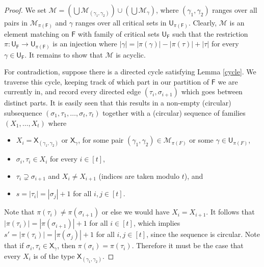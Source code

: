 \documentclass[10pt]{amsart}
\newcommand{\MM}{\mathcal{M}}
\theoremstyle{definition}
\begin{document}
\begin{proof}
		We set $\MM=(\bigcup\MM_{(\gamma_1,\gamma_2)})\cup (\bigcup\MM_\gamma)$, where $(\gamma_1, \gamma_2)$ ranges over all pairs in $\MM_{\pi(\mathsf{F})}$ and $\gamma$ ranges over all critical sets in $\mathsf{U}_{\pi(\mathsf{F})}$. 
		Clearly, $\MM$ is an element matching on $\mathsf{F}$ with family of critical sets $\mathsf{U}_\mathsf{F}$ such that the restriction $\pi: \mathsf{U}_\mathsf{F}\to \mathsf{U}_{\pi(\mathsf{F})}$ is an injection where $|\gamma|=|\pi(\gamma)|-|\pi(\tau)|+|\tau|$ for every $\gamma \in \mathsf{U}_{\mathsf{F}}$.
		It remains to show that $\MM$ is acyclic. 
		
		For contradiction, suppose there is a directed cycle 
		satisfying Lemma \ref{cycle}.
		We traverse this cycle, keeping track of which part in our partition of $\mathsf{F}$ we are currently in, and record every directed edge $(\tau_i, \sigma_{i+1})$ which goes between distinct parts. It is easily seen that this results in a non-empty (circular) subsequence $(\sigma_{1}, \tau_{1}, \dots, \sigma_{t}, \tau_{t})$ together with a (circular) sequence of families $(X_1, \dots, X_t)$ where
		\begin{itemize}
			\item $X_i = \mathsf{X}_{(\gamma_1, \gamma_2)}$ or $\mathsf{X}_\gamma$, for some pair $(\gamma_1, \gamma_2) \in \MM_{\pi(F)}$ or some $\gamma \in \mathsf{U}_{\pi(F)}$,
			\item $\sigma_{i}, \tau_{i} \in X_i$ for every $i\in [t]$,
			\item $\tau_{i} \supsetneq \sigma_{i+1}$ and $X_i\ne X_{i+1}$ (indices are taken modulo $t$), and
			\item $s=|\tau_i|=|\sigma_{j}|+1$ for all $i,j\in [t]$. \end{itemize}
		Note that $\pi(\tau_i) \neq \pi(\sigma_{i+1})$ or else we would have $X_i = X_{i+1}$. It follows that $|\pi(\tau_i)|= |\pi(\sigma_{i+1})|+1$ for all $i\in [t]$, which implies $s' = |\pi(\tau_i)| = |\pi(\sigma_j)|+1$ for all $i,j\in [t]$, since the sequence is circular. Note that if $\sigma_i, \tau_i \in \mathsf{X}_{\gamma}$, then $\pi(\sigma_i) = \pi(\tau_i)$. Therefore it must be the case that every $X_i$ is of the type $\mathsf{X}_{(\gamma_1, \gamma_2)}$.

\end{proof}
\end{document}
